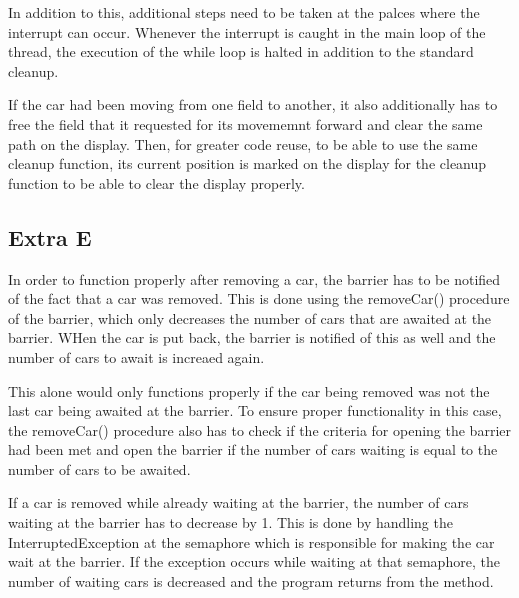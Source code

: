 In addition to this, additional steps need to be taken at the palces where the interrupt can occur. Whenever the interrupt is caught in the main loop of the thread, the execution of the while loop is halted in addition to the standard cleanup.

If the car had been moving from one field to another, it also additionally has to free the field that it requested for its movememnt forward and clear the same path on the display. Then, for greater code reuse, to be able to use the same cleanup function, its current position is marked on the display for the cleanup function to be able to clear the display properly.

\subsection{Extra E}

In order to function properly after removing a car, the barrier has to be notified of the fact that a car was removed. This is done using the removeCar() procedure of the barrier, which only decreases the number of cars that are awaited at the barrier. WHen the car is put back, the barrier is notified of this as well and the number of cars to await is increaed again.

This alone would only functions properly if the car being removed was not the last car being awaited at the barrier. To ensure proper functionality in this case, the removeCar() procedure also has to check if the criteria for opening the barrier had been met and open the barrier if the number of cars waiting is equal to the number of cars to be awaited. 

If a car is removed while already waiting at the barrier, the number of cars waiting at the barrier has to decrease by 1. This is done by handling the InterruptedException at the semaphore which is responsible for making the car wait at the barrier. If the exception occurs while waiting at that semaphore, the number of waiting cars is decreased and the program returns from the method.





